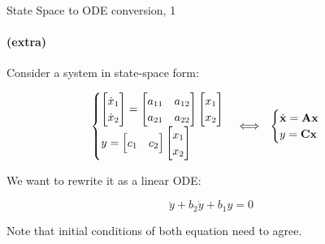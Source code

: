 \documentclass{beamer}
\begin{document}
\begin{frame}{State Space to ODE conversion, 1}
	\framesubtitle{(extra)}
	\begin{flushleft}
		
		Consider a system in state-space form:
		
		\begin{equation}
			\label{eq:SS}
			\begin{cases}
				\begin{bmatrix}
					\dot x_1 \\ 
					\dot x_2
				\end{bmatrix} 
				= 
				\begin{bmatrix}
					a_{11} & a_{12} \\ 
					a_{21} & a_{22}
				\end{bmatrix} 
				\begin{bmatrix}
					x_1 \\ 
					x_2
				\end{bmatrix} 
				\\
				y = 
				\begin{bmatrix}
					c_1 & 
					c_2
				\end{bmatrix} 
				\begin{bmatrix}
					x_1 \\ 
					x_2
				\end{bmatrix} 
			\end{cases}
			\Longleftrightarrow \ \ 
			\begin{cases}
				\dx{x} = \bo{A} \bo{x} \\
				y = \bo{C} \bo{x} 
			\end{cases}
		\end{equation}
		
		We want to rewrite it as a linear ODE:
		
		\begin{equation}
			\label{eq:ODE}
			\ddot{y} + b_2 \dot{y} + b_1 y = 0
		\end{equation}
		
		Note that initial conditions of both equation need to agree.
		
		
	\end{flushleft}
\end{frame}
\end{document}
